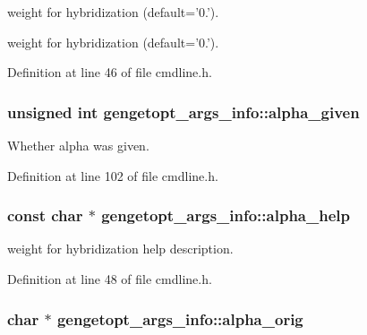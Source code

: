 weight for hybridization (default='0.'). 

weight for hybridization (default='0.'). 

Definition at line 46 of file cmdline.\+h.

\hypertarget{structgengetopt__args__info_a2843ef7fb6a39e43eccc1088e4d63f6f}{
\subsubsection[{alpha\+\_\+given}]{\setlength{\rightskip}{0pt plus 5cm}unsigned int gengetopt\+\_\+args\+\_\+info\+::alpha\+\_\+given}}\label{structgengetopt__args__info_a2843ef7fb6a39e43eccc1088e4d63f6f}


Whether alpha was given. 



Definition at line 102 of file cmdline.\+h.

\hypertarget{structgengetopt__args__info_a9c0b0c04fb015f10016df0054a8ce4f6}{
\subsubsection[{alpha\+\_\+help}]{\setlength{\rightskip}{0pt plus 5cm}const char $\ast$ gengetopt\+\_\+args\+\_\+info\+::alpha\+\_\+help}}\label{structgengetopt__args__info_a9c0b0c04fb015f10016df0054a8ce4f6}


weight for hybridization help description. 



Definition at line 48 of file cmdline.\+h.

\hypertarget{structgengetopt__args__info_a764f3e0a251f142ad756912a7f8e43a2}{
\subsubsection[{alpha\+\_\+orig}]{\setlength{\rightskip}{0pt plus 5cm}char $\ast$ gengetopt\+\_\+args\+\_\+info\+::alpha\+\_\+orig}}\label{structgengetopt__args__info_a764f3e0a251f142ad756912a7f8e43a2}



